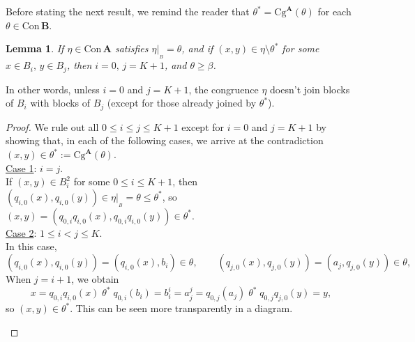 \documentclass[cm,dissertation]{uhthesis}
\theoremstyle{plain}
\newtheorem{lemma}[theorem]{Lemma}
\theoremstyle{definition}
\theoremstyle{remark}
\numberwithin{theorem}{section}
\numberwithin{claim}{chapter}
\numberwithin{equation}{section}
\numberwithin{conjecture}{chapter}
\newcommand{\<}{\ensuremath{\langle}}
\renewcommand{\>}{\ensuremath{\rangle}}
\renewcommand{\leq}{\ensuremath{\leqslant}}
\renewcommand{\geq}{\ensuremath{\geqslant}}
\newcommand{\Cg}{\ensuremath{\mathrm{Cg}}}
\newcommand{\Con}{\ensuremath{\mathrm{Con\,}}}
\newcommand{\0}{\ensuremath{\mathbf{0}}}
\newcommand{\1}{\ensuremath{\mathbf{1}}}
\newcommand{\2}{\ensuremath{\mathbf{2}}}
\newcommand{\3}{\ensuremath{\mathbf{3}}}
\newcommand{\4}{\ensuremath{\mathbf{4}}}
\newcommand{\5}{\ensuremath{\mathbf{5}}}
\newcommand{\bA}{\ensuremath{\mathbf{A}}}
\newcommand{\bB}{\ensuremath{\mathbf{B}}}
\newcommand{\resB}{\ensuremath{|_{_B}}}
\begin{document}
Before stating the next result, we remind the reader that %
$\theta^* = \Cg^\bA(\theta)$ for each $\theta \in \Con\bB$. 
\begin{lemma}
  \label{lem3.1}
  If $\eta \in \Con\bA$ satisfies $\eta\resB =
  \theta$, and if $(x,y) \in \eta \setminus \theta^*$ for some 
  $x\in B_i, \, y\in B_j$, then $i=0, \, j=K+1$, and $\theta \geq \beta$.
\end{lemma}
In other words, unless $i=0$ and $j=K+1$, the congruence $\eta$ doesn't join blocks
of $B_i$ with blocks of $B_j$ (except for those already joined by
$\theta^*$).
\begin{proof}
  We rule out all $0\leq i \leq j \leq K+1$ except for $i=0$ and $j=K+1$ by
  showing that, in each of the following cases, we arrive at the contradiction
  $(x,y)\in \theta^*:= \Cg^\bA(\theta)$.\\[6pt]
  \underline{Case 1}: $i=j$.\\[4pt]
  If $(x,y)\in B_i^2$ for some $0\leq i \leq K+1$, then
  $(q_{i,0}(x),q_{i,0}(y))\in \eta\resB = \theta \leq \theta^*$, so 
  $(x,y) = (q_{0,i} q_{i,0}(x),q_{0,i} q_{i,0}(y))\in \theta^*$.
  \\[6pt]
  \underline{Case 2}: $1\leq i < j \leq K$.\\[4pt]
  In this case,
  \[ %
  (q_{i,0}(x),q_{i,0}(y)) = 
  (q_{i,0}(x), b_{i})\in \theta, \qquad
  (q_{j,0}(x),q_{j,0}(y))= (a_{j},q_{j,0}(y))\in\theta,
  \] %
  When $j= i+1$, we obtain
  \begin{equation}
    \label{eq:OA4}
    x = q_{0,i}q_{i,0}(x)\; \theta^* \; q_{0,i}(b_i) = b_i^i = a^j_j = q_{0,j}(a_j) \;
    \theta^* \; q_{0,j} q_{j,0}(y) = y,
  \end{equation}
  so $(x,y)\in \theta^*$.  
  This can be seen more transparently in a diagram.
  \begin{center}
    
\end{center}
\end{proof}
\end{document}

